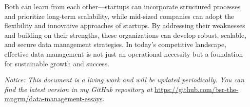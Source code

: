 \documentclass{article}
\begin{document}
Both can learn from each other—startups can incorporate structured processes and prioritize long-term scalability, while mid-sized companies can adopt the flexibility and innovative approaches of startups. By addressing their weaknesses and building on their strengths, these organizations can develop robust, scalable, and secure data management strategies. In today’s competitive landscape, effective data management is not just an operational necessity but a foundation for sustainable growth and success.

\bigskip
\noindent \textit{Notice: This document is a living work and will be updated periodically. You can find the latest version in my GitHub repository at} \href{https://github.com/bsr-the-mngrm/data-management-essays}{https://github.com/bsr-the-mngrm/data-management-essays}.



\end{document}
